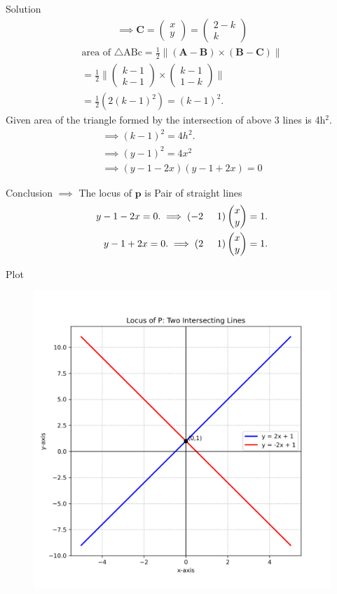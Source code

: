 \documentclass{beamer}
\numberwithin{equation}{section}
\providecommand{\brak}[1]{\ensuremath{\left(#1\right)}}
\theoremstyle{remark}
\providecommand{\norm}[1]{\lVert#1\rVert}
\newcommand{\myvec}[1]{\ensuremath{\begin{pmatrix}#1\end{pmatrix}}}
\let\vec\mathbf
\begin{document}
    \begin{frame}{Solution}
        \begin{align}
    \implies \vec{C}=\myvec{x\\y}=\myvec{2-k\\k}
\end{align}
\begin{align}
    \text{area of }\triangle \text{ABc}=\frac{1}{2}\norm{(\vec{A}-\vec{B})\times(\vec{B}-\vec{C})}\\
    =\frac{1}{2}\norm{\myvec{k-1\\k-1}\times\myvec{k-1\\1-k}}\\
    =\frac{1}{2}(2(k-1)^2)=(k-1)^2.
\end{align}
Given area of the triangle formed by the intersection of above 3 lines is 4h$^2$.
\begin{align}
    \implies (k-1)^2= 4h^2.\\
    \implies (y-1)^2=4x^2\\
    \implies(y-1-2x)(y-1+2x)=0
    \end{align}
    \end{frame}

    \begin{frame}{Conclusion}
        $\implies$ The locus of $\vec{p}$ is Pair of  straight lines
    \begin{align}
     y-1-2x=0. \implies  \brak{-2\hspace{0.5cm}1}\myvec{x\\y}=1.\\
     y-1+2x=0. \implies  \brak{2\hspace{0.5cm}1}\myvec{x\\y}=1.
   \end{align}
    \end{frame}
    
    

\begin{frame}{Plot}
    \begin{figure}[H]
    \centering
    \includegraphics[width=0.70\columnwidth]{figs/01.png}
    \label{fig-1}
\end{figure}
\end{frame}
\end{document}

